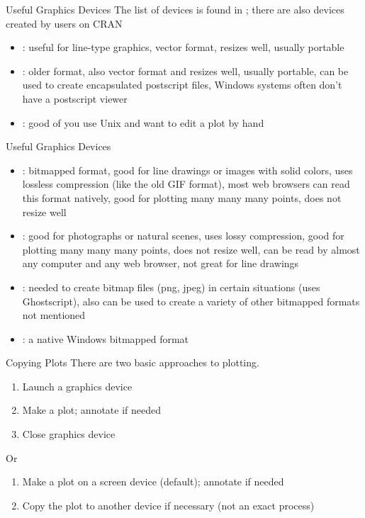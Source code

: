 \documentclass[aspectratio=169]{beamer}
\begin{document}
\begin{frame}{Useful Graphics Devices}
The list of devices is found in ; there are also
devices created by users on CRAN
\begin{itemize}
\item
{}: useful for line-type graphics, vector
format, resizes well, usually portable
\item
{}: older format, also vector format and resizes well,
usually portable, can be used to create encapsulated postscript files,
Windows systems often don't have a postscript viewer
\item
{}: good of you use Unix and want to edit a plot by hand
\end{itemize}
\end{frame}

\begin{frame}{Useful Graphics Devices}
\begin{itemize}
\item
{}: bitmapped format, good for line drawings or images with
solid colors, uses lossless compression (like the old GIF format),
most web browsers can read this format natively, good for plotting
many many many points, does not resize well
\item
{}: good for photographs or natural scenes, uses lossy
compression, good for plotting many many many points, does not resize
well, can be read by almost any computer and any web browser, not
great for line drawings
\item
{}: needed to create bitmap files (png, jpeg) in certain
situations (uses Ghostscript), also can be used to create a variety of
other bitmapped formats not mentioned
\item
{}: a native Windows bitmapped format
\end{itemize}
\end{frame}


\begin{frame}{Copying Plots}
There are two basic approaches to plotting.
\begin{enumerate}
\item
Launch a graphics device
\item
Make a plot; annotate if needed
\item
Close graphics device
\end{enumerate}
Or
\begin{enumerate}
\item
Make a plot on a screen device (default); annotate if needed
\item
Copy the plot to another device if necessary (not an exact process)
\end{enumerate}
\end{frame}
\end{document}

